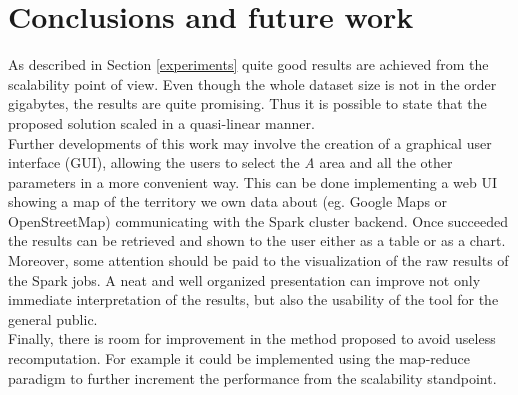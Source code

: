 \documentclass{sig-alternate-05-2015}
\begin{document}
\section{Conclusions and future work}
As described in Section \ref{experiments} quite good results are achieved from the scalability point of view. Even though the whole dataset size is not in the order gigabytes, the results are quite promising. Thus it is possible to state that the proposed solution scaled in a quasi-linear manner.\\
Further developments of this work may involve the creation of a graphical user interface (GUI), allowing the users to select the \emph{A} area and all the other parameters in a more convenient way. This can be done implementing a web UI showing a map of the territory we own data about (eg. Google Maps or OpenStreetMap) communicating with the Spark cluster backend. Once succeeded the results can be retrieved and shown to the user either as a table or as a chart.\\
Moreover, some attention should be paid to the visualization of the raw results of the Spark jobs. A neat and well organized presentation can improve not only immediate interpretation of the results, but also the usability of the tool for the general public.\\
Finally, there is room for improvement in the method proposed to avoid useless recomputation. For example it could be implemented using the map-reduce paradigm to further increment the performance from the scalability standpoint.


%



%
%
\end{document}

